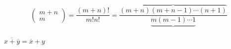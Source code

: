 \documentclass[12pt]{article}
\begin{document}
$$
\left(
\begin{array}{c}
m+n\\
m
\end{array}
\right)
=  \frac{(m+n)!}{m!n!}
=  \frac {\overbrace{(m+n)(m+n-1)\cdots(n+1)}}{\underbrace{m(m-1)\cdots  1}}
$$
\\[1cm]

$\overline{x+\overline{y}}  =  \overline{x}+y$
\end{document}
